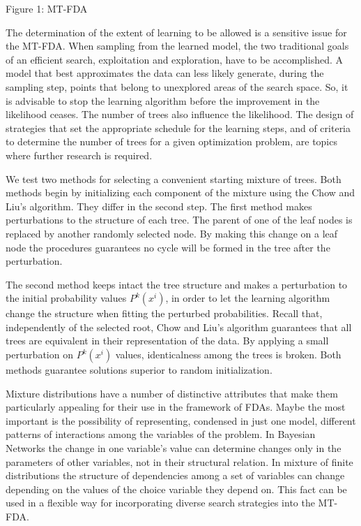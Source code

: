 \documentclass[10pt,thmsa]{article}
\begin{document}
\medskip

Figure 1: MT-FDA

\medskip

The determination of the extent of learning to be allowed is a sensitive
issue for the MT-FDA. When sampling from the learned model, the two
traditional goals of an efficient search, exploitation and exploration, have
to be accomplished. A model that best approximates the data can less likely
generate, during the sampling step, points that belong to unexplored areas
of the search space. So, it is advisable to stop the learning algorithm
before the improvement in the likelihood ceases. The number of trees also
influence the likelihood. The design of strategies that set the appropriate
schedule for the learning steps, and of criteria to determine the number of
trees for a given optimization problem, are topics where further research is
required.

We test two methods for selecting a convenient starting mixture of trees.
Both methods begin by initializing each component of the mixture using the
Chow and Liu's algorithm. They differ in the second step. The first method
makes perturbations to the structure of each tree. The parent of one of the
leaf nodes is replaced by another randomly selected node. By making this
change on a leaf node the procedures guarantees no cycle will be formed in
the tree after the perturbation.

The second method keeps intact the tree structure and makes a perturbation
to the initial probability values $P^k(x^i)$, in order to let the learning
algorithm change the structure when fitting the perturbed probabilities.
Recall that, independently of the selected root, Chow and Liu's algorithm
guarantees that all trees are equivalent in their representation of the
data. By applying a small perturbation on $P^k(x^i)$ values, identicalness
among the trees is broken. Both methods guarantee solutions superior to
random initialization.

Mixture distributions have a number of distinctive attributes that make them
particularly appealing for their use in the framework of FDAs. Maybe the
most important is the possibility of representing, condensed in just one
model, different patterns of interactions among the variables of the
problem. In Bayesian Networks the change in one variable's value can
determine changes only in the parameters of other variables, not in their
structural relation. In mixture of finite distributions the structure of
dependencies among a set of variables can change depending on the values of
the choice variable they depend on. This fact can be used in a flexible way
for incorporating diverse search strategies into the MT-FDA.
\end{document}
